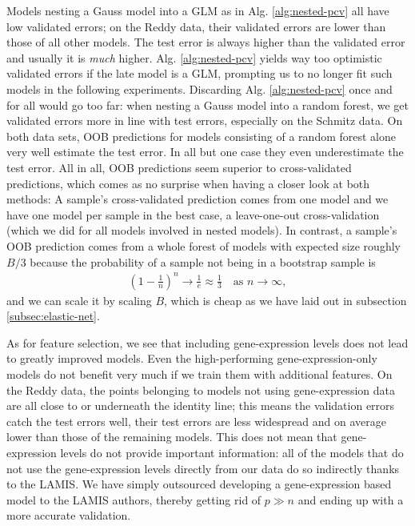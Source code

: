 Models 
nesting a Gauss model into a GLM as in Alg. \ref{alg:nested-pcv} all have low validated errors; on 
the Reddy data, their validated errors are lower than those of all other models. The test error is 
always higher than the validated error and usually it is \textit{much} higher. Alg. \ref{alg:nested-pcv} 
yields way too optimistic validated errors if the late model is a GLM, prompting us to no longer 
fit such models in the following experiments. Discarding Alg. \ref{alg:nested-pcv} once and for all
would go too far: when nesting a Gauss model into a random forest, we get validated errors more in 
line with test errors, especially on the Schmitz data. On both data sets, OOB predictions for 
models consisting of a random forest alone very well estimate the test error. In all but one case 
they even underestimate the test error. All in all, OOB predictions seem superior to 
cross-validated predictions, which comes as no surprise when having a closer look at both 
methods: A sample's cross-validated prediction comes from one model and we have one model per 
sample in the best case, a leave-one-out cross-validation (which we did for all models involved in 
nested models). In contrast, a sample's OOB prediction comes from a whole forest of models with 
expected size roughly $B/3$ because the probability of a sample not being in a bootstrap sample 
is
\begin{align}
    \left( 1 - \frac{1}{n} \right)^n \to \frac{1}{e} \approx \frac{1}{3} \quad \text{as } n \to 
    \infty,
\end{align}
and we can scale it by scaling $B$, which is cheap as we have laid out in subsection 
\ref{subsec:elastic-net}.

As for feature selection, we see that including gene-expression levels does not lead to greatly 
improved models. Even the high-performing gene-expression-only models do not benefit very much if 
we train them with additional features. On the Reddy data, the points belonging to models not using 
gene-expression data are all close to or underneath the identity line; this means the validation 
errors 
catch the test errors well, their test errors are less widespread and on average lower than those 
of the remaining models. This does not mean that gene-expression levels do not provide important 
information: all of the models that do not use the gene-expression levels directly from our data 
do so indirectly thanks to the LAMIS. We have simply outsourced developing a gene-expression based 
model to the LAMIS authors, thereby getting rid of $p \gg n$ and ending up with a more accurate 
validation.

